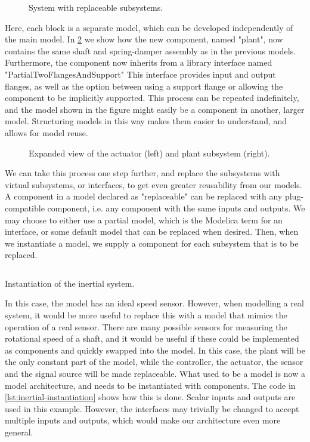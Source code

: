 \documentclass[\rootfolder/main.tex]{subfiles}
\begin{document}
\begin{figure}[ht]
    \caption{System with replaceable subsystems.\label{fig:inertial-architecture}}
\end{figure}

Here, each block is a separate model, which can be developed independently of the main model.
In \cref{fig:inertial-architecture-blowup} we show how the new component, named "plant", now contains the same shaft and spring-damper assembly as in the previous models.
Furthermore, the component now inherits from a library interface named "PartialTwoFlangesAndSupport"
This interface provides input and output flanges, as well as the option between using a support flange or allowing the component to be implicitly supported.
This process can be repeated indefinitely, and the model shown in the figure might easily be a component in another, larger model.
Structuring models in this way makes them easier to understand, and allows for model reuse.

\begin{figure}[ht]
    \scriptsize
    \caption{Expanded view of the actuator (left) and plant subsystem (right).\label{fig:inertial-architecture-blowup}}
\end{figure}

We can take this process one step further, and replace the subsystems with virtual subsystems, or interfaces, to get even greater reusability from our models.
A component in a model declared as "replaceable" can be replaced with any plug-compatible component, i.e. any component with the same inputs and outputs.
We may choose to either use a partial model, which is the Modelica term for an interface, or some default model that can be replaced when desired.
Then, when we instantiate a model, we supply a component for each subsystem that is to be replaced.

\begin{listing}[ht]
    \inputminted[fontsize=\footnotesize]{Modelica}{\rootfolder/Models/MasterProject/Models/Inertial.mo}
    \caption{Instantiation of the inertial system.\label{lst:inertial-instantiation}}
\end{listing}

In this case, the model has an ideal speed sensor. 
However, when modelling a real system, it would be more useful to replace this with a model that mimics the operation of a real sensor.
There are many possible sensors for measuring the rotational speed of a shaft, and it would be useful if these could be implemented as components and quickly swapped into the model.
In this case, the plant will be the only constant part of the model, while the controller, the actuator, the sensor and the signal source will be made replaceable.
What used to be a model is now a model architecture, and needs to be instantiated with components.
The code in \cref{lst:inertial-instantiation} shows how this is done.
Scalar inputs and outputs are used in this example.
However, the interfaces may trivially be changed to accept multiple inputs and outputs, which would make our architecture even more general.
\end{document}
